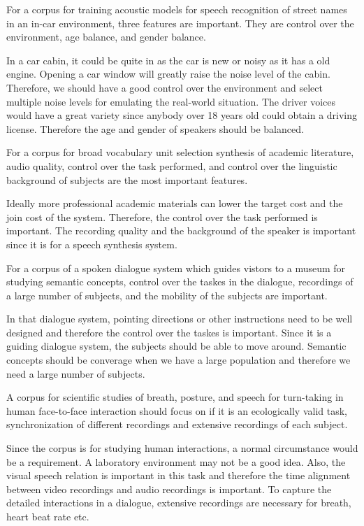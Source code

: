 \documentclass[12pt]{article}
\newenvironment{problem}[2][Problem]{\begin{trivlist}
\item[\hskip \labelsep {\bfseries #1}\hskip \labelsep {\bfseries #2.}]}{\end{trivlist}}
\begin{document}
\begin{problem}{4.3}
    For a corpus for training acoustic models for speech recognition of street names
    in an in-car environment, three features are important. They are
    control over the environment, age balance, and gender balance.

    In a car cabin, it could be quite in as the car is new or noisy as it has a 
    old engine.
    Opening a car window will greatly raise the noise level of the cabin. Therefore,
    we should have a good control over the environment and select multiple noise
    levels for emulating the real-world situation. 
    The driver voices would have a great variety since anybody over 18 years old
    could obtain a driving license.
    Therefore the age and gender of speakers should be balanced.

    For a corpus for broad vocabulary unit selection synthesis of academic literature,
    audio quality, control over the task performed, and control over the linguistic 
    background of subjects are the most important features.

    Ideally more professional academic materials can lower the target cost and 
    the join cost of the system. Therefore, the control over the task performed
    is important. The recording quality and the background of the speaker is 
    important since it is for a speech synthesis system.
   
    For a corpus of a spoken dialogue system which guides vistors to a museum 
    for studying semantic concepts, 
    control over the taskes in the dialogue, recordings of a large number of subjects,
    and the mobility of the subjects are important.

    In that dialogue system, pointing directions or other instructions need to be well
    designed and therefore the control over the taskes is important. Since it is
    a guiding dialogue system, the subjects should be able to move around.
    Semantic concepts should be converage when we have a large population and 
    therefore we need a large number of subjects.    

    A corpus for scientific studies of breath, posture, and speech for turn-taking
    in human face-to-face interaction should focus on if it is an ecologically 
    valid task, synchronization of different recordings and 
    extensive recordings of each subject.

    Since the corpus is for studying human interactions, a normal circumstance
    would be a requirement. A laboratory environment may not be a good idea.
    Also, the visual speech relation is important in this task and therefore
    the time alignment between video recordings and audio recordings is important. 
    To capture the detailed interactions in a dialogue, extensive recordings are
    necessary for breath, heart beat rate etc.
\end{problem}
\pagebreak
\end{document}
